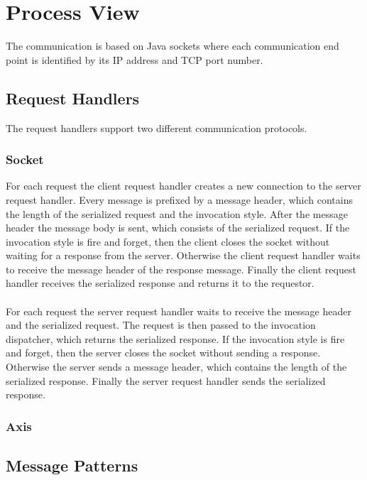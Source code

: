\section{Process View}

The communication is based on Java sockets where each communication end point is identified by its IP address and TCP port number.

\subsection{Request Handlers}

The request handlers support two different communication protocols.

\subsubsection{Socket}

For each request the client request handler creates a new connection to the server request handler.
Every message is prefixed by a message header, which contains the length of the serialized request and the invocation style.
After the message header the message body is sent, which consists of the serialized request.
If the invocation style is fire and forget, then the client closes the socket without waiting for a response from the server.
Otherwise the client request handler waits to receive the message header of the response message.
Finally the client request handler receives the serialized response and returns it to the requestor.
\\
\\
For each request the server request handler waits to receive the message header and the serialized request.
The request is then passed to the invocation dispatcher, which returns the serialized response.
If the invocation style is fire and forget, then the server closes the socket without sending a response.
Otherwise the server sends a message header, which contains the length of the serialized response.
Finally the server request handler sends the serialized response.

\subsubsection{Axis}

\subsection{Message Patterns}

